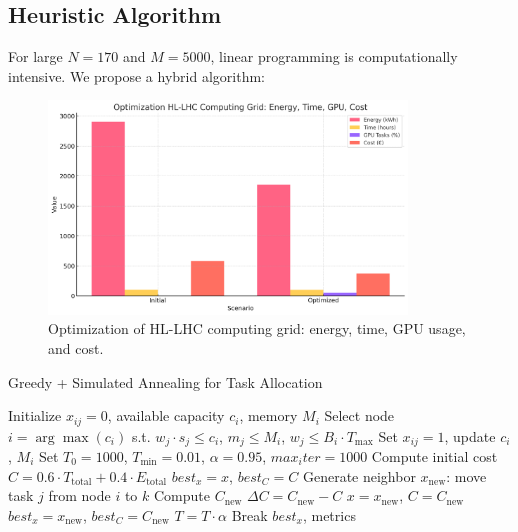 \documentclass[a4paper,11pt]{article}
\begin{document}
\subsection{Heuristic Algorithm}
For large $N=170$ and $M=5000$, linear programming is computationally intensive. We propose a hybrid algorithm:
\begin{figure}[htbp]
    \centering
    \includegraphics[width=0.85\textwidth]{optimization_chart.png}
    \caption{Optimization of HL-LHC computing grid: energy, time, GPU usage, and cost.}
    \label{fig:optimization_chart}
\end{figure}
\begin{algorithm}
\caption{Greedy + Simulated Annealing for Task Allocation}
\begin{algorithmic}
\State Initialize $x_{ij} = 0$, available capacity $c_i$, memory $M_i$
    \State Select node $i = \arg\max(c_i)$ s.t. $w_j \cdot s_j \leq c_i$, $m_j \leq M_i$, $w_j \leq B_i \cdot T_{\text{max}}$
    \State Set $x_{ij} = 1$, update $c_i$, $M_i$
\EndFor
\State Set $T_0 = 1000$, $T_{\text{min}} = 0.01$, $\alpha = 0.95$, $max_iter = 1000$
\State Compute initial cost $C = 0.6 \cdot T_{\text{total}} + 0.4 \cdot E_{\text{total}}$
\State $best_x = x$, $best_C = C$
    \State Generate neighbor $x_{\text{new}}$: move task $j$ from node $i$ to $k$
        \State Compute $C_{\text{new}}$
        \State $\Delta C = C_{\text{new}} - C$
            \State $x = x_{\text{new}}$, $C = C_{\text{new}}$
                \State $best_x = x_{\text{new}}$, $best_C = C_{\text{new}}$
            \EndIf
        \EndIf
    \EndIf
    \State $T = T \cdot \alpha$
        \State Break
    \EndIf
\EndFor
\State \Return $best_x$, metrics
\end{algorithmic}
\end{algorithm}
\end{document}
